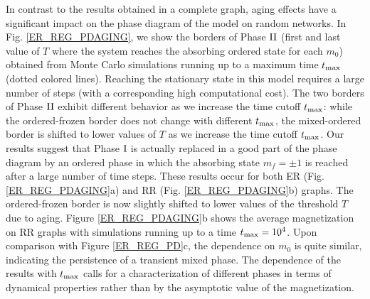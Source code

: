 In contrast to the results obtained in a complete graph, aging effects have a significant impact on the phase diagram of the model on random networks. In Fig. \ref{ER_REG_PDAGING}, we show the borders of Phase ${\rm II}$ (first and last value of $T$ where the system reaches the absorbing ordered state for each $m_0$) obtained from Monte Carlo simulations running up to a maximum time $t_{\rm max}$ (dotted colored lines). Reaching the stationary state in this model requires a large number of steps (with a corresponding high computational cost). The two borders of Phase ${\rm II}$ exhibit different behavior as we increase the time cutoff $t_{\rm max}$: while the ordered-frozen border does not change with different $t_{\rm max}$, the mixed-ordered border is shifted to lower values of $T$ as we increase the time cutoff $t_{\rm max}$. Our results suggest that Phase ${\rm I}$ is actually replaced in a good part of the phase diagram by an ordered phase in which the absorbing state $m_f = \pm 1$ is reached after a large number of time steps. These results occur for both ER (Fig. \ref{ER_REG_PDAGING}a) and RR (Fig. \ref{ER_REG_PDAGING}b) graphs. The ordered-frozen border is now slightly shifted to lower values of the threshold $T$ due to aging. Figure \ref{ER_REG_PDAGING}b shows the average magnetization on RR graphs with simulations running up to a time $t_{\rm max} = 10^4$. Upon comparison with Figure \ref{ER_REG_PD}c, the dependence on $m_0$ is quite similar, indicating the persistence of a transient mixed phase. The dependence of the results with $t_{\rm max}$ calls for a characterization of different phases in terms of dynamical properties rather than by the asymptotic value of the magnetization.


